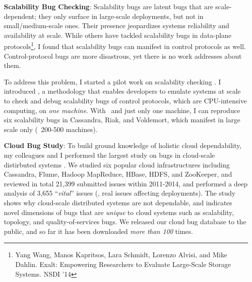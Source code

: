 \documentclass[10pt]{article}
\begin{document}
\noindent
\textbf{Scalability Bug Checking}: Scalability bugs are latent bugs that are
scale-dependent; they only surface in large-scale deployments, but not in
small/medium-scale ones. Their presence jeopardizes systems reliability and
availability at scale. 
%
While others have tackled scalability bugs in data-plane protocols\footnote{Yang
Wang, Manos Kapritsos, Lara Schmidt, Lorenzo Alvisi, and Mike Dahlin.
Exalt: Empowering Researchers to Evaluate Large-Scale Storage Systems. NSDI
'14}, I found that scalability bugs can manifest in control protocols as well.
Control-protocol bugs are more disastrous, yet there is no work addresses about
them.
 
To address this problem, I started a pilot work on scalability checking
\cite{Gunawi+17-SCk-Insub,Leesatapornwongsa+17-SCk-InPrep}. I introduced \sck, a
methodology that enables developers to emulate systems at scale to check and
debug scalability bugs of control protocols, which are CPU-intensive computing,
on \textit{one machine}. 
%
With \sck\ and just only one machine, I can reproduce six scalability bugs in
Cassandra, Riak, and Voldemort, which manifest in large scale only (\eg\
200-500 machines). 


\noindent
\textbf{Cloud Bug Study}: To build ground knowledge of holistic cloud
dependability, my colleagues and I performed the largest study on bugs in
cloud-scale distirbuted systems \cite{Gunawi+14-Cbs}. We studied six popular
cloud infrastructures including Cassandra, Flume, Hadoop MapReduce, HBase, HDFS,
and ZooKeeper, and reviewed in total 21,399 submitted issues within 2011-2014,
and performed a deep analysis of 3,655 ``\textit{vital}'' issues (\ie, real
issues affecting deployments). The study shows why cloud-scale distributed
systems are not dependable, and indicates novel dimensions of bugs that are
\textit{unique} to cloud systems such as scalability, topology, and
quality-of-services bugs. We released our cloud bug database to the public, and
so far it has been downloaded \textit{more than 100} times.


\end{document}
